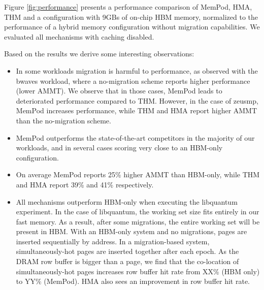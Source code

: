 Figure \ref{fig:performance} presents a performance comparison of MemPod, HMA, THM and a configuration with 9GBs of on-chip HBM memory, normalized to the performance of a hybrid memory configuration without migration capabilities. We evaluated all mechanisms with caching disabled. 

Based on the results we derive some interesting observations:
\begin{itemize}[leftmargin=0.4cm]
\setlength\itemsep{0em}
	\item {} In some workloads migration is harmful to performance, as observed with the bwaves workload, where a no-migration scheme reports higher performance (lower AMMT). We observe that in those cases, MemPod leads to deteriorated performance compared to THM. However, in the case of zeusmp, MemPod increases performance, while THM and HMA report higher AMMT than the no-migration scheme.
	\item MemPod outperforms the state-of-the-art competitors in the majority of our workloads, and in several cases scoring very close to an HBM-only configuration. 
	\item On average MemPod reports 25\% higher AMMT than HBM-only, while THM and HMA report 39\% and 41\% respectively.
	\item All mechanisms outperform HBM-only when executing the libquantum experiment. In the case of libquantum, the working set size fits entirely in our fast memory. As a result, after some migrations, the entire working set will be present in HBM.  With an HBM-only system and no migrations, pages
are inserted sequentially by address.  In a migration-based system, 
simultaneously-hot pages are inserted together after each epoch.  As the
DRAM row buffer is bigger than a page, we find that the co-location of
simultaneously-hot pages increases row buffer hit rate from XX\% (HBM only)
to YY\% (MemPod).  HMA also sees an improvement in row buffer hit rate.

\end{itemize}

